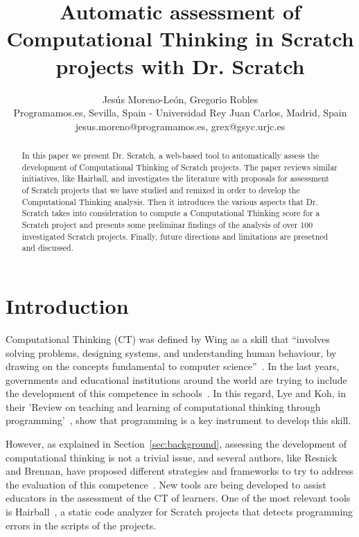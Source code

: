 \documentclass[a4paper,11pt]{article}
\title{Automatic assessment of Computational Thinking in Scratch projects with Dr. Scratch}
\author{Jesús Moreno-León, Gregorio Robles \\ Programamos.es, Sevilla, Spain - Universidad Rey Juan Carlos, Madrid, Spain \\ jesus.moreno@programamos.es, grex@gsyc.urjc.es}
\begin{document}
\maketitle

\begin{abstract}
In this paper we present Dr. Scratch, a web-based tool to automatically assess the development of Computational Thinking of Scratch projects. The paper reviews similar initiatives, like Hairball, and investigates the literature with proposals for assessment of Scratch projects that we have studied and remixed in order to develop the Computational Thinking analysis. Then it introduces the various aspects that Dr. Scratch takes into consideration to compute a Computational Thinking score for a Scratch project and presents some preliminar findings of the analysis of over 100 investigated Scratch projects. Finally, future directions and limitations are presetned and discussed.

\end{abstract}

\section{Introduction}

Computational Thinking (CT) was defined by Wing as a skill that ``involves solving problems, designing systems, and understanding human behaviour, by drawing on the concepts fundamental to computer science''~\cite{wing2006computational}. In the last years, governments and educational institutions around the world are trying to include the development of this competence in schools~\cite{euschoolnet}. In this regard, Lye and Koh, in their 'Review on teaching and learning of computational thinking through programming'~\cite{lye2014review}, show that programming is a key instrument to develop this skill.

However, as explained in Section~\ref{sec:background}, assessing the development of computational thinking is not a trivial issue, and several authors, like Resnick and Brennan, have proposed different strategies and frameworks to try to address the evaluation of this competence~\cite{brennan2012new}. New tools are being developed to assist educators in the assessment of the CT of learners. One of the most relevant tools is Hairball~\cite{boe2013hairball}, a static code analyzer for Scratch projects that detects programming errors in the scripts of the projects.
\end{document}
